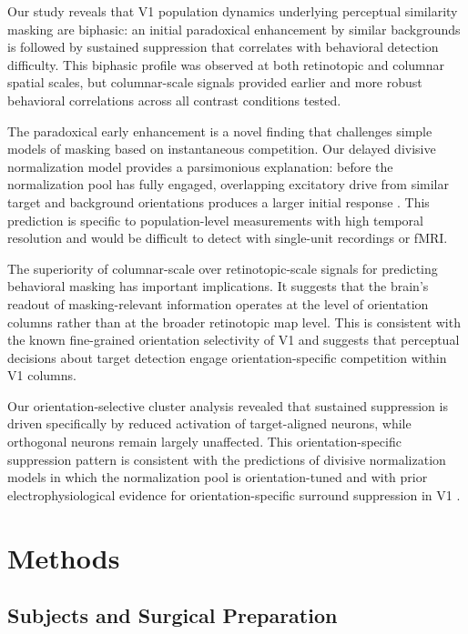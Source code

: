 \documentclass[11pt]{article}
\begin{document}
Our study reveals that V1 population dynamics underlying perceptual similarity masking are biphasic: an initial paradoxical enhancement by similar backgrounds is followed by sustained suppression that correlates with behavioral detection difficulty. This biphasic profile was observed at both retinotopic and columnar spatial scales, but columnar-scale signals provided earlier and more robust behavioral correlations across all contrast conditions tested.

The paradoxical early enhancement is a novel finding that challenges simple models of masking based on instantaneous competition. Our delayed divisive normalization model provides a parsimonious explanation: before the normalization pool has fully engaged, overlapping excitatory drive from similar target and background orientations produces a larger initial response \citep{carandini2012}. This prediction is specific to population-level measurements with high temporal resolution and would be difficult to detect with single-unit recordings or fMRI.

The superiority of columnar-scale over retinotopic-scale signals for predicting behavioral masking has important implications. It suggests that the brain's readout of masking-relevant information operates at the level of orientation columns rather than at the broader retinotopic map level. This is consistent with the known fine-grained orientation selectivity of V1 \citep{hubel1962, bonhoeffer1991} and suggests that perceptual decisions about target detection engage orientation-specific competition within V1 columns.

Our orientation-selective cluster analysis revealed that sustained suppression is driven specifically by reduced activation of target-aligned neurons, while orthogonal neurons remain largely unaffected. This orientation-specific suppression pattern is consistent with the predictions of divisive normalization models in which the normalization pool is orientation-tuned \citep{schwartz2001, reynolds2009} and with prior electrophysiological evidence for orientation-specific surround suppression in V1 \citep{angelucci2017, cavanaugh2002}.

\section{Methods}

\subsection{Subjects and Surgical Preparation}
\end{document}
